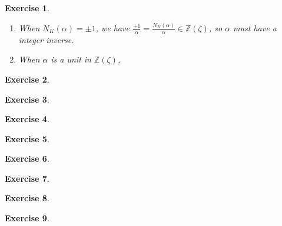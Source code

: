 \documentclass{article}
\theoremstyle{breakstyle}
\newtheorem{exercise}{Exercise}[section]
\begin{document}
\begin{exercise}
    \leavevmode \vspace{-\baselineskip}
    \begin{enumerate}[label=\roman*.]
        \item When $N_K (\alpha) = \pm 1$, we have $\frac{\pm 1}{\alpha} = \frac{N_K (\alpha)}{\alpha} \in \mathbb{Z} (\zeta)$, so $\alpha$ must have a integer inverse.
        
        \item When $\alpha$ is a unit in $\mathbb{Z} (\zeta)$,
    \end{enumerate}
\end{exercise}

\begin{exercise}
\end{exercise}

\begin{exercise}
\end{exercise}

\begin{exercise}
\end{exercise}

\begin{exercise}
\end{exercise}

\begin{exercise}
\end{exercise}

\begin{exercise}
\end{exercise}

\begin{exercise}
\end{exercise}

\begin{exercise}
\end{exercise}
\end{document}
